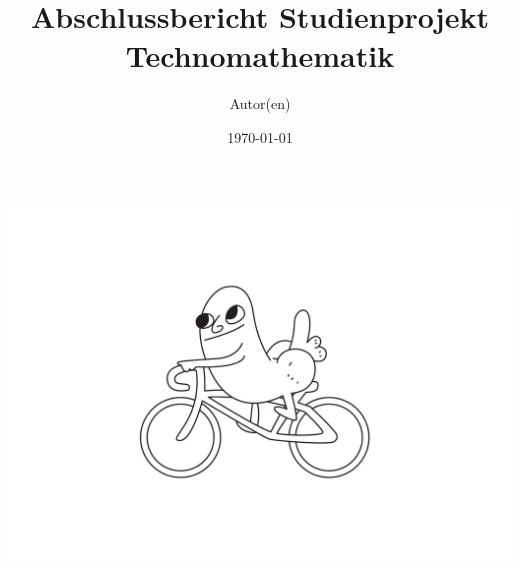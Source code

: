\documentclass[a4paper]{scrartcl}
\title{Abschlussbericht Studienprojekt Technomathematik}
\date{\today}
\author{Autor(en)}
\begin{document}
\maketitle
\newpage
\tableofcontents
\newpage
\includegraphics[scale=0.69]{db.pdf}




\end{document}
